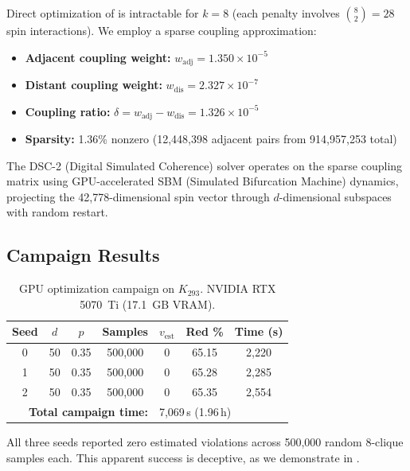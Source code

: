 \documentclass[12pt,a4paper]{article}
\theoremstyle{definition}
\theoremstyle{remark}
\newcommand{\Kn}[1]{K_{#1}}
\begin{document}
Direct optimization of  is intractable for $k = 8$ (each penalty involves $\binom{8}{2} = 28$ spin interactions).  We employ a sparse coupling approximation:

\begin{itemize}
\item \textbf{Adjacent coupling weight:} $w_{\text{adj}} = 1.350 \times 10^{-5}$
\item \textbf{Distant coupling weight:} $w_{\text{dis}} = 2.327 \times 10^{-7}$
\item \textbf{Coupling ratio:} $\delta = w_{\text{adj}} - w_{\text{dis}} = 1.326 \times 10^{-5}$
\item \textbf{Sparsity:} 1.36\% nonzero (12,448,398 adjacent pairs from 914,957,253 total)
\end{itemize}

The DSC-2 (Digital Simulated Coherence) solver operates on the sparse coupling matrix using GPU-accelerated SBM (Simulated Bifurcation Machine) dynamics, projecting the 42,778-dimensional spin vector through $d$-dimensional subspaces with random restart.

\subsection{Campaign Results}

\begin{table}[H]
\centering
\caption{GPU optimization campaign on $\Kn{293}$.  NVIDIA RTX 5070~Ti (17.1~GB VRAM).}
\label{tab:gpu}
\begin{tabular}{@{}ccccccc@{}}
\toprule
\textbf{Seed} & \textbf{$d$} & \textbf{$p$} & \textbf{Samples} & \textbf{$v_{\text{est}}$} & \textbf{Red \%} & \textbf{Time (s)} \\
\midrule
0 & 50 & 0.35 & 500{,}000 & 0 & 65.15 & 2{,}220 \\
1 & 50 & 0.35 & 500{,}000 & 0 & 65.28 & 2{,}285 \\
2 & 50 & 0.35 & 500{,}000 & 0 & 65.35 & 2{,}554 \\
\midrule
\multicolumn{4}{r}{\textbf{Total campaign time:}} & \multicolumn{3}{l}{7{,}069\,s (1.96\,h)} \\
\bottomrule
\end{tabular}
\end{table}

All three seeds reported zero estimated violations across 500,000 random $8$-clique samples each.  This apparent success is deceptive, as we demonstrate in .
\end{document}
